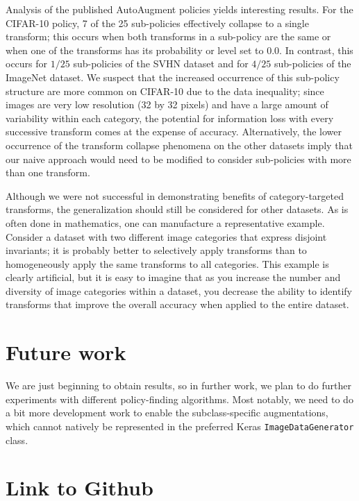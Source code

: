 \documentclass[10pt,twocolumn,letterpaper]{article}
\begin{document}
  Analysis of the published AutoAugment policies yields interesting results. For the CIFAR-10 policy, 7 of the 25 sub-policies effectively collapse to a single transform; this occurs when both transforms in a sub-policy are the same or when one of the transforms has its probability or level set to $0.0$. In contrast, this occurs for $1/25$ sub-policies of the SVHN dataset and for $4/25$ sub-policies of the ImageNet dataset. We suspect that the increased occurrence of this sub-policy structure are more common on CIFAR-10 due to the data inequality; since images are very low resolution (32 by 32 pixels) and have a large amount of variability within each category, the potential for information loss with every successive transform comes at the expense of accuracy. Alternatively, the lower occurrence of the transform collapse phenomena on the other datasets imply that our naive approach would need to be modified to consider sub-policies with more than one transform. 

  Although we were not successful in demonstrating benefits of category-targeted transforms, the generalization should still be considered for other datasets. As is often done in mathematics, one can manufacture a representative example. Consider a dataset with two different image categories that express disjoint invariants; it is probably better to selectively apply transforms than to homogeneously apply the same transforms to all categories. This example is clearly artificial, but it is easy to imagine that as you increase the number and diversity of image categories within a dataset, you decrease the ability to identify transforms that improve the overall accuracy when applied to the entire dataset.

\section{Future work}

  We are just beginning to obtain results, so in further work, we plan to do further experiments with different policy-finding algorithms. Most notably, we need to do a bit more development work to enable the subclass-specific augmentations, which cannot natively be represented in the preferred Keras \texttt{ImageDataGenerator} class.

\section{Link to Github}
\end{document}

